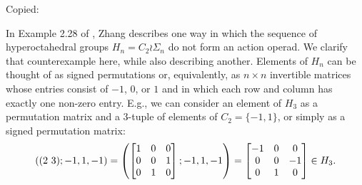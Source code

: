 \begin{example}\label{ex:counterex2}
Copied:

In Example 2.28 of \cite{zhang-grp}, Zhang describes one way in which the sequence of hyperoctahedral groups $H_n = C_2 \wr \Sigma_n$ do not form an action operad. We clarify that counterexample here, while also describing another. Elements of $H_n$ can be thought of as signed permutations or, equivalently, as $n \times n$ invertible matrices whose entries consist of $-1$, $0$, or $1$ and in which each row and column has exactly one non-zero entry. E.g., we can consider an element of $H_3$ as a permutation matrix and a $3$-tuple of elements of $C_2 = \{-1,1\}$, or simply as a signed permutation matrix:
  \[
    \left(( 2 \, \, 3 )
    ;
    -1,1,-1\right)
    =
    \left(\begin{bmatrix}
    1 & 0 & 0 \\
    0 & 0 & 1 \\
    0 & 1 & 0
    \end{bmatrix}
    ;
    -1,1,-1\right)
    =
    \begin{bmatrix}
    -1 & 0 & 0 \\
    0 & 0 & -1 \\
    0 & 1 & 0
    \end{bmatrix}
    \in H_3.
  \]


\end{example}
